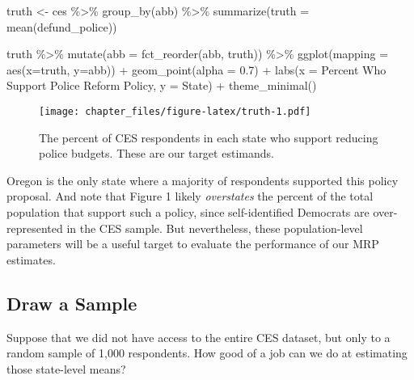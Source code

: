 \documentclass[
]{article}
\newenvironment{Shaded}{\begin{snugshade}}{\end{snugshade}}
\newcommand{\AttributeTok}[1]{\textcolor[rgb]{0.77,0.63,0.00}{#1}}
\newcommand{\FloatTok}[1]{\textcolor[rgb]{0.00,0.00,0.81}{#1}}
\newcommand{\FunctionTok}[1]{\textcolor[rgb]{0.00,0.00,0.00}{#1}}
\newcommand{\NormalTok}[1]{#1}
\newcommand{\OtherTok}[1]{\textcolor[rgb]{0.56,0.35,0.01}{#1}}
\newcommand{\SpecialCharTok}[1]{\textcolor[rgb]{0.00,0.00,0.00}{#1}}
\newcommand{\StringTok}[1]{\textcolor[rgb]{0.31,0.60,0.02}{#1}}
\begin{document}
\begin{Shaded}
\begin{Highlighting}[]
\NormalTok{truth }\OtherTok{\textless{}{-}}\NormalTok{ ces }\SpecialCharTok{\%\textgreater{}\%} 
  \FunctionTok{group\_by}\NormalTok{(abb) }\SpecialCharTok{\%\textgreater{}\%} 
  \FunctionTok{summarize}\NormalTok{(}\AttributeTok{truth =} \FunctionTok{mean}\NormalTok{(defund\_police))}

\NormalTok{truth }\SpecialCharTok{\%\textgreater{}\%} 
  \FunctionTok{mutate}\NormalTok{(}\AttributeTok{abb =} \FunctionTok{fct\_reorder}\NormalTok{(abb, truth)) }\SpecialCharTok{\%\textgreater{}\%} 
  \FunctionTok{ggplot}\NormalTok{(}\AttributeTok{mapping =} \FunctionTok{aes}\NormalTok{(}\AttributeTok{x=}\NormalTok{truth, }\AttributeTok{y=}\NormalTok{abb)) }\SpecialCharTok{+}
  \FunctionTok{geom\_point}\NormalTok{(}\AttributeTok{alpha =} \FloatTok{0.7}\NormalTok{) }\SpecialCharTok{+}
  \FunctionTok{labs}\NormalTok{(}\AttributeTok{x =} \StringTok{\textquotesingle{}Percent Who Support Police Reform Policy\textquotesingle{}}\NormalTok{,}
       \AttributeTok{y =} \StringTok{\textquotesingle{}State\textquotesingle{}}\NormalTok{) }\SpecialCharTok{+}
  \FunctionTok{theme\_minimal}\NormalTok{()}
\end{Highlighting}
\end{Shaded}

\begin{figure}
\centering
\texttt{[image: chapter\_files/figure-latex/truth-1.pdf]}
\caption{The percent of CES respondents in each state who support
reducing police budgets. These are our target estimands.}
\end{figure}

Oregon is the only state where a majority of respondents supported this
policy proposal. And note that Figure 1 likely \emph{overstates} the
percent of the total population that support such a policy, since
self-identified Democrats are over-represented in the CES sample. But
nevertheless, these population-level parameters will be a useful target
to evaluate the performance of our MRP estimates.

\hypertarget{draw-a-sample}{%
\subsection{Draw a Sample}\label{draw-a-sample}}

Suppose that we did not have access to the entire CES dataset, but only
to a random sample of 1,000 respondents. How good of a job can we do at
estimating those state-level means?
\end{document}
